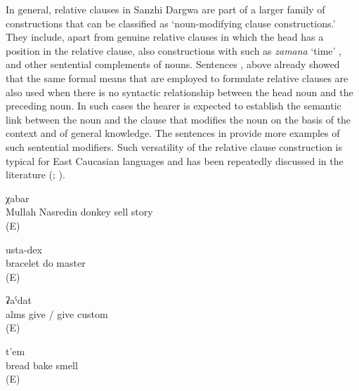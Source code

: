 In general, relative clauses in Sanzhi Dargwa are part of a larger family of constructions that can be classified as `noun-modifying clause constructions.' They include, apart from genuine relative clauses in which the head has a position in the relative clause, also constructions with   such as \textit{zamana} `time' ,  and other sentential complements of nouns. Sentences ,  above already showed that the same formal means that are employed to formulate relative clauses are also used when there is no syntactic relationship between the head noun and the preceding noun. In such cases the hearer is expected to establish the semantic link between the noun and the clause that modifies the noun on the basis of the context and of general knowledge. The sentences in  provide more examples of such sentential modifiers. Such versatility of the relative clause construction is typical for East Caucasian languages and has been repeatedly discussed in the literature (\citealp{Daniel.Lander2008, Daniel.Lander2010}; \citealp{Comrie.Forker.Khalilova2017}).
%
\begin{exe}
	\ex	\label{ex:the story that Mulla Nasredin sold a donkey}
		χabar\\
		Mullah	Nasredin	donkey	sell	story\\
	\glt	{} (E)

	\ex	\label{ex:the mastery of making bracelets}
		usta-dex\\
		bracelet	do	master\\
	\glt	{} (E)

	\ex	\label{ex:the tradition of giving alms}
		ʡaˁdat\\
		alms	give	/	give	custom\\
	\glt	{} (E)

	\ex	\label{ex:the smell of baking bread}
	\gll	[t'ult'	b-uc'-an]	t'em\\
		bread	bake	smell\\
	\glt	{} (E)
\end{exe}

